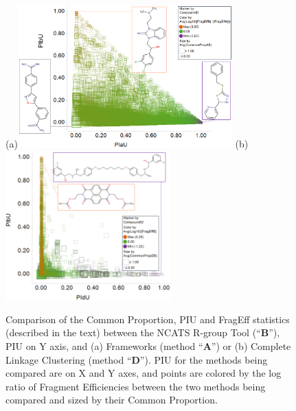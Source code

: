 \documentclass[journal=jacsat,biochem,manuscript=article]{achemso}
\begin{document}
\begin{figure}
(a)\includegraphics[width=3.25in]{fig/statcompare_frames_RGtool_transparent_density_v3.png}
(b)\includegraphics[width=2.5in]{fig/statcompare_CLink_RGtool_transparent_density_v2.png}
  \caption{Comparison of the Common Proportion, PIU and FragEff statistics (described in the text) between the NCATS R-group Tool (``{\bf B}''),
    PIU on Y axis,
    and (a) Frameworks (method ``{\bf A}'')
    or (b) Complete Linkage Clustering (method ``{\bf D}'').
    PIU for the methods being compared are on X and Y axes, and points are 
    colored by the log ratio of Fragment Efficiencies between the two methods being compared and sized by their Common Proportion.}
\label{fig:statcompare}
\end{figure}
\end{document}
